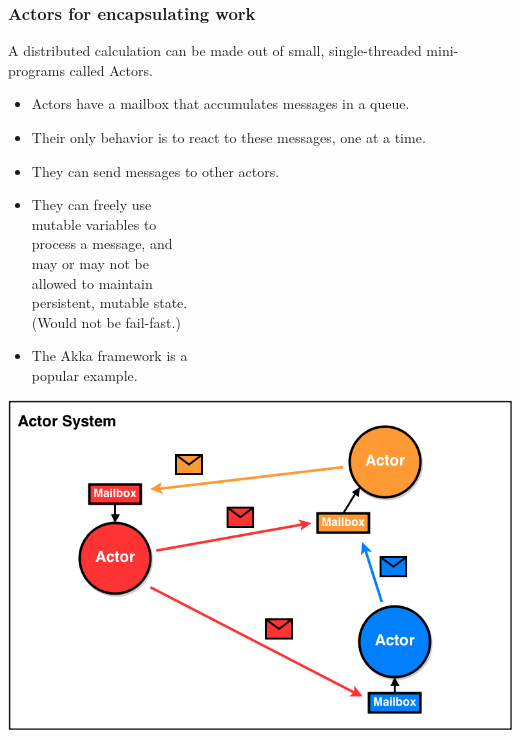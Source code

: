 \documentclass[compress]{beamer}
\begin{document}
\begin{frame}
\frametitle{Actors for encapsulating work}

A distributed calculation can be made out of small, single-threaded mini-programs called Actors.

\vspace{0.2 cm}
\begin{itemize}
\item Actors have a mailbox that accumulates messages in a queue.
\item Their only behavior is to react to these messages, one at a time.
\item They can send messages to other actors.
\item They can freely use \\ mutable variables to \\ process a message, and \\ may or may not be \\ allowed to maintain \\ persistent, mutable state. \\ (Would not be fail-fast.)
\item The Akka framework is a \\ popular example.
\end{itemize}

\vspace{-3.8 cm}
\hfill \includegraphics[width=0.55\linewidth]{PLOTS/ActorModel.png}
\end{frame}
\end{document}
